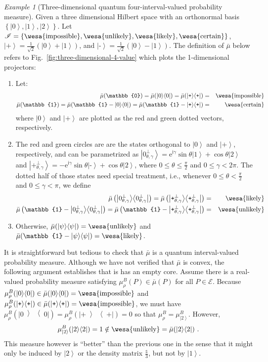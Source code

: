 \documentclass{article}
\theoremstyle{remark}
\newtheorem{example}{Example}\newtheorem{definition}{Definition}\newtheorem{thm}{Theorem}
\newcommand{\events}{\ensuremath{\mathcal{E}}}
\newcommand{\imposs}{{\mbox{\wesa{impossible}}}}
\newcommand{\likely}{{\mbox{\wesa{likely}}}}
\newcommand{\unlikely}{{\mbox{\wesa{unlikely}}}}
\newcommand{\necess}{{\mbox{\wesa{certain}}}}
\newcommand{\ket}[1]{{\left\vert{#1}\right\rangle}}
\newcommand{\op}[2]{\ensuremath{\left\vert{#1}\middle\rangle\middle\langle{#2}\right\vert}}
\newcommand{\proj}[1]{\op{#1}{#1}}
\newcommand{\ps}{\texttt{+}}
\newcommand{\ms}{\texttt{-}}
\newcommand{\rme}{\mathrm{e}}
\newcommand{\rmi}{\mathrm{i}}
\begin{document}
\begin{example}[Three-dimensional quantum four-interval-valued probability measure]\label{ex:three-dimensional-4-value}
Given a three dimensional Hilbert space with an orthonormal basis
$\left\{ \ket{0},\ket{1},\ket{2}\right\} $. Let \emph{ }$\mathscr{I}=\left\{ \imposs,\unlikely,\likely,\necess\right\} $,
$\ket{\ps}=\frac{1}{\sqrt{2}}(\ket{0}+\ket{1})$, and $\ket{\ms}=\frac{1}{\sqrt{2}}(\ket{0}-\ket{1})$.
The definition of $\bar{\mu}$ below refers to Fig.~\ref{fig:three-dimensional-4-value}
which plots the 1-dimensional projectors: 
\begin{enumerate}
\item Let: 
\begin{eqnarray*}
\bar{\mu}(\mathbb{0})=\bar{\mu}(\proj{0})=\bar{\mu}(\proj{\ps}) & = & \imposs\\
\bar{\mu}(\mathbb{1})=\bar{\mu}(\mathbb{1}-\proj{0})=\bar{\mu}(\mathbb{1}-\proj{\ps}) & = & \necess
\end{eqnarray*}
where $\ket{0}$ and $\ket{\ps}$ are plotted as the red and green
dotted vectors, respectively. 
\item The red and green circles are are the states orthogonal to $\ket{0}$
and $\ket{\ps}$, respectively, and can be parametrized as $\ket{0_{\theta,\gamma}^{\perp}}=\rme^{\rmi\gamma}\sin\theta\ket{1}+\cos\theta\ket{2}$
and $\ket{\ps_{\theta,\gamma}^{\perp}}=-\rme^{\rmi\gamma}\sin\theta\ket{\ms}+\cos\theta\ket{2}$,
where $0\le\theta\le\frac{\pi}{2}$ and $0\le\gamma<2\pi$. The dotted
half of those states need special treatment, i.e., whenever $0\le\theta<\frac{\pi}{2}$
and $0\le\gamma<\pi$, we define 
\begin{eqnarray*}
\bar{\mu}\left(\proj{0_{\theta,\gamma}^{\perp}}\right)=\bar{\mu}\left(\proj{\ps_{\theta,\gamma}^{\perp}}\right) & = & \likely\\
\bar{\mu}\left(\mathbb{1}-\proj{0_{\theta,\gamma}^{\perp}}\right)=\bar{\mu}\left(\mathbb{1}-\proj{\ps_{\theta,\gamma}^{\perp}}\right) & = & \unlikely
\end{eqnarray*}
\item Otherwise, $\bar{\mu}(\proj{\psi})=\unlikely$ and $\bar{\mu}(\mathbb{1}-\proj{\psi})=\likely$. 
\end{enumerate}
It is straightforward but tedious to check that $\bar{\mu}$ is a
quantum interval-valued probability measure. Although we have not
verified that $\bar{\mu}$ is convex, the following argument establishes
that is has an empty core. Assume there is a real-valued probability
measure satisfying $\mu_{\rho}^{B}(P)\in\bar{\mu}(P)$ for all $P\in\events$.
Because $\mu_{\rho}^{B}(\proj{0})\in\bar{\mu}(\proj{0})=\imposs$
and $\mu_{\rho}^{B}(\proj{\ps})\in\bar{\mu}(\proj{\ps})=\imposs$,
we must have $\mu_{\rho}^{B}(\proj{0})=\mu_{\rho}^{B}(\proj{\ps})=0$
so that $\mu_{\rho}^{B}=\mu_{\ket{2}}^{B}$. However, 
\[
\mu_{\ket{2}}^{B}(\proj{2})=1\notin\unlikely=\bar{\mu}(\proj{2})\textrm{ .}
\]
This measure however is ``better'' than the previous one in the
sense that it might only be induced by $\ket{2}$ or the density matrix
$\frac{\mathbb{1}}{3}$, but not by $\ket{1}$. \end{example}
\end{document}
